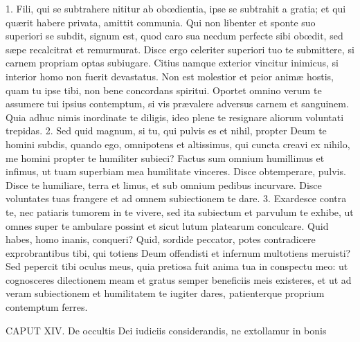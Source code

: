 1. Fili, qui se subtrahere nititur ab obœdientia, ipse se subtrahit a gratia; et qui quærit habere privata, amittit communia. Qui non libenter et sponte suo superiori se subdit, signum est, quod caro sua necdum perfecte sibi obœdit, sed sæpe recalcitrat et remurmurat. Disce ergo celeriter superiori tuo te submittere, si carnem propriam optas subiugare. Citius namque exterior vincitur inimicus, si interior homo non fuerit devastatus. Non est molestior et peior animæ hostis, quam tu ipse tibi, non bene concordans spiritui. Oportet omnino verum te assumere tui ipsius contemptum, si vis prævalere adversus carnem et sanguinem. Quia adhuc nimis inordinate te diligis, ideo plene te resignare aliorum voluntati trepidas.
2. Sed quid magnum, si tu, qui pulvis es et nihil, propter Deum te homini subdis, quando ego, omnipotens et altissimus, qui cuncta creavi ex nihilo, me homini propter te humiliter subieci? Factus sum omnium humillimus et infimus, ut tuam superbiam mea humilitate vinceres. Disce obtemperare, pulvis. Disce te humiliare, terra et limus, et sub omnium pedibus incurvare. Disce voluntates tuas frangere et ad omnem subiectionem te dare.
3. Exardesce contra te, nec patiaris tumorem in te vivere, sed ita subiectum et parvulum te exhibe, ut omnes super te ambulare possint et sicut lutum platearum conculcare. Quid habes, homo inanis, conqueri? Quid, sordide peccator, potes contradicere exprobrantibus tibi, qui totiens Deum offendisti et infernum multotiens meruisti? Sed pepercit tibi oculus meus, quia pretiosa fuit anima tua in conspectu meo: ut cognosceres dilectionem meam et gratus semper beneficiis meis existeres, et ut ad veram subiectionem et humilitatem te iugiter dares, patienterque proprium contemptum ferres.


CAPUT XIV.
De occultis Dei iudiciis considerandis, ne extollamur in bonis

